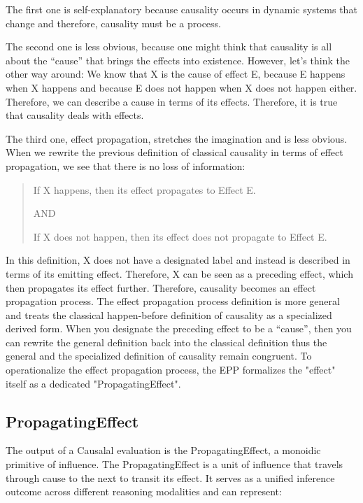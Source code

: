 The first one is self-explanatory because causality occurs in dynamic systems that change and therefore, causality must be a process.

The second one is less obvious, because one might think that causality is all about the “cause” that brings the effects into existence. However, let’s think the other way around: We know that X is the cause of effect E, because E happens when X happens and because E does not happen when X does not happen either. Therefore, we can describe a cause in terms of its effects. Therefore, it is true that causality deals with effects.

The third one, effect propagation, stretches the imagination and is less obvious. When we rewrite the previous definition of classical causality in terms of effect propagation, we see that there is no loss of information:

\begin{quote}
    If X happens, then its effect propagates to Effect E.

    AND

    If X does not happen, then its effect does not propagate to Effect E.
\end{quote}

In this definition, X does not have a designated label and instead is described in terms of its emitting effect. Therefore, X can be seen as a preceding effect, which then propagates its effect further. Therefore, causality becomes an effect propagation process. The effect propagation process definition is more general and treats the classical happen-before definition of causality as a specialized derived form. When you designate the preceding effect to be a “cause”, then you can rewrite the general definition back into the classical definition thus the general and the specialized definition of causality remain congruent. To operationalize the effect propagation process, the EPP formalizes the "effect" itself as a dedicated "PropagatingEffect".

\subsection{PropagatingEffect}
\label{sec:propagating_effect}

The output of a Causalal evaluation is the PropagatingEffect, a monoidic primitive of influence. The PropagatingEffect is a unit of influence that travels through cause to the next to transit its effect.
It serves as a unified inference outcome across different reasoning modalities and can represent:

